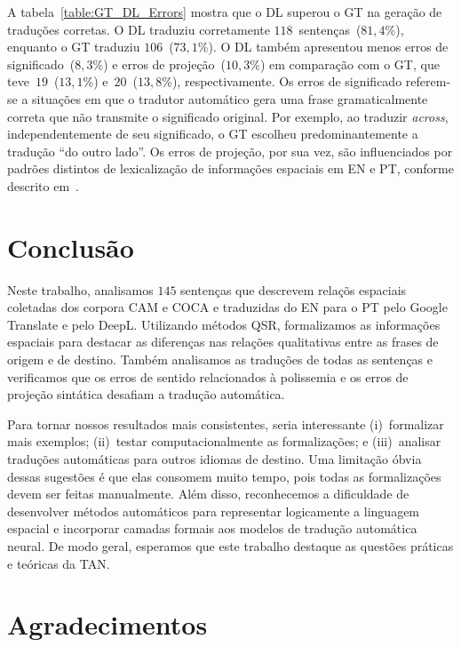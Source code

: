 \documentclass[a4paper, twocolumn, 11pt, twoside]{article}
\begin{document}
A tabela~\ref{table:GT_DL_Errors} mostra que o DL superou o GT na geração de traduções corretas. O DL traduziu
corretamente $118$~sentenças~($81,4$\%), enquanto o GT traduziu $106$~($73,1$\%). 
O DL também apresentou menos erros de significado~($8,3$\%) e erros de projeção~($10,3$\%) em comparação com 
o GT, que teve~$19$~($13,1$\%) e~$20$~($13,8$\%), respectivamente. Os erros de significado referem-se a situações em que o tradutor automático gera uma frase gramaticalmente correta 
que não transmite o significado original. Por exemplo, ao traduzir \textit{across}, independentemente de seu significado, o GT escolheu predominantemente a tradução ``do outro lado''.
Os erros de projeção, por sua vez, são influenciados por padrões distintos de lexicalização de informações 
espaciais em EN e PT, conforme descrito em~\citet{talmy1985lexicalization, talmy2000toward}. 



\section{Conclusão}



Neste trabalho, analisamos $145$ sentenças que descrevem relaçõs espaciais coletadas dos corpora CAM e COCA e 
traduzidas do EN para o PT pelo Google Translate e pelo DeepL. Utilizando métodos QSR, formalizamos as 
informações espaciais para destacar as diferenças nas relações qualitativas entre as frases de origem e de destino. 
Também analisamos as traduções de todas as sentenças e verificamos que os erros de sentido relacionados à polissemia e os erros de projeção sintática desafiam a tradução automática.

Para tornar nossos resultados mais consistentes, seria interessante (i)~formalizar mais exemplos; 
(ii)~testar computacionalmente as formalizações; e (iii)~analisar traduções automáticas para outros idiomas de destino. 
Uma limitação óbvia dessas sugestões é que elas consomem muito tempo, pois todas as formalizações devem ser feitas manualmente. 
Além disso, reconhecemos a dificuldade de desenvolver métodos automáticos para representar logicamente a linguagem espacial e 
incorporar camadas formais aos modelos de tradução automática neural. De modo geral, esperamos que este trabalho destaque as questões práticas e teóricas da TAN.


\section{Agradecimentos}




\end{document}
